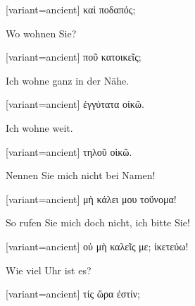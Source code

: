 \begin{greek}[variant=ancient]%
καὶ ποδαπός;

\end{greek}%
\switchcolumn*

Wo wohnen Sie?

\switchcolumn

\begin{greek}[variant=ancient]%
ποῦ κατοικεῖς;

\end{greek}%
\switchcolumn*

Ich wohne ganz in der Nähe.

\switchcolumn

\begin{greek}[variant=ancient]%
ἐγγύτατα οἰκῶ.

\end{greek}%
\switchcolumn*

Ich wohne weit.

\switchcolumn

\begin{greek}[variant=ancient]%
τηλοῦ οἰκῶ.

\end{greek}%
\switchcolumn*

Nennen Sie mich nicht bei Namen!

\switchcolumn

\begin{greek}[variant=ancient]%
μὴ κάλει μου τοὔνομα!

\end{greek}%
\switchcolumn*

So rufen Sie mich doch nicht, ich bitte Sie!

\switchcolumn

\begin{greek}[variant=ancient]%
οὐ μὴ καλεῖς με; ἱκετεύω!

\end{greek}%
\indent Wie viel Uhr ist es?

\switchcolumn

\begin{greek}[variant=ancient]%
τίς ὥρα ἐστίν;

\end{greek}%
\switchcolumn*

